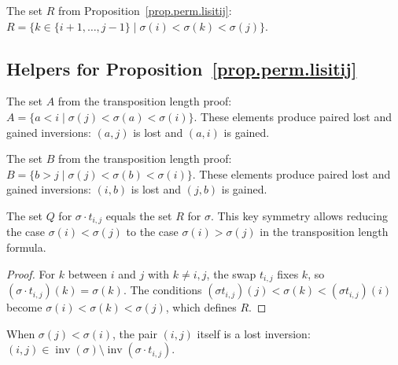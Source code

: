 \begin{definition}
\label{def.perm.setR}
\leanhelper
\leanok
The set $R$ from Proposition~\ref{prop.perm.lisitij}:
$R = \{k \in \{i+1, \ldots, j-1\} \mid \sigma(i) < \sigma(k) < \sigma(j)\}$.
\end{definition}

\subsection{Helpers for Proposition~\ref{prop.perm.lisitij}}

\begin{definition}
\label{def.perm.setA}
\leanhelper
\leanok
The set $A$ from the transposition length proof:
$A = \{a < i \mid \sigma(j) < \sigma(a) < \sigma(i)\}$.
These elements produce paired lost and gained inversions:
$(a, j)$ is lost and $(a, i)$ is gained.
\end{definition}

\begin{definition}
\label{def.perm.setB}
\leanhelper
\leanok
The set $B$ from the transposition length proof:
$B = \{b > j \mid \sigma(j) < \sigma(b) < \sigma(i)\}$.
These elements produce paired lost and gained inversions:
$(i, b)$ is lost and $(j, b)$ is gained.
\end{definition}

\begin{lemma}
\label{lem.perm.setQ_swap_eq_setR}
\leanhelper
\leanok
The set $Q$ for $\sigma \cdot t_{i,j}$ equals the set $R$ for $\sigma$.
This key symmetry allows reducing the case $\sigma(i) < \sigma(j)$
to the case $\sigma(i) > \sigma(j)$ in the transposition length formula.
\end{lemma}

\begin{proof}
\leanok
For $k$ between $i$ and $j$ with $k \neq i, j$, the swap $t_{i,j}$ fixes $k$,
so $(\sigma \cdot t_{i,j})(k) = \sigma(k)$. The conditions
$(\sigma t_{i,j})(j) < \sigma(k) < (\sigma t_{i,j})(i)$ become
$\sigma(i) < \sigma(k) < \sigma(j)$, which defines $R$.
\end{proof}

\begin{lemma}
\label{lem.perm.ij_lost}
\leanhelper
\leanok
When $\sigma(j) < \sigma(i)$, the pair $(i,j)$ itself is a lost inversion:
$(i,j) \in \operatorname{inv}(\sigma) \setminus \operatorname{inv}(\sigma \cdot t_{i,j})$.
\end{lemma}

